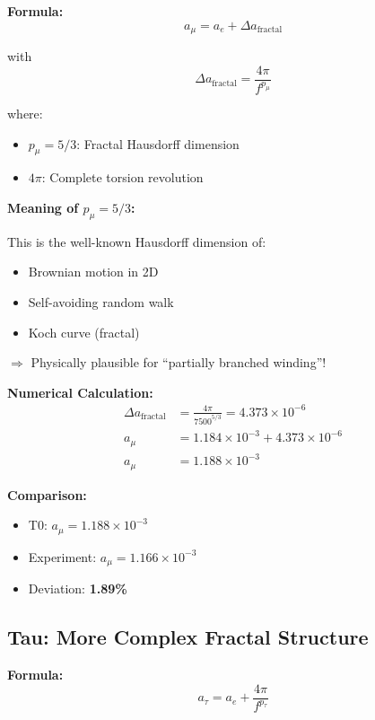 	\textbf{Formula:}
	\begin{equation}
		a_\mu = a_e + \Delta a_{\text{fractal}}
		\label{eq:amu}
	\end{equation}
	
	with
	\begin{equation}
		\Delta a_{\text{fractal}} = \frac{4\pi}{f^{p_\mu}}
		\label{eq:delta_mu}
	\end{equation}
	
	where:
	\begin{itemize}
		\item $p_\mu = 5/3$: Fractal Hausdorff dimension
		\item $4\pi$: Complete torsion revolution
	\end{itemize}
	
	\textbf{Meaning of $p_\mu = 5/3$:}
	
	This is the well-known Hausdorff dimension of:
	\begin{itemize}
		\item Brownian motion in 2D
		\item Self-avoiding random walk
		\item Koch curve (fractal)
	\end{itemize}
	
	$\Rightarrow$ Physically plausible for ``partially branched winding''!
	
	\textbf{Numerical Calculation:}
	\begin{align}
		\Delta a_{\text{fractal}} &= \frac{4\pi}{7500^{5/3}} = 4.373 \times 10^{-6} \\
		a_\mu &= 1.184 \times 10^{-3} + 4.373 \times 10^{-6} \\
		a_\mu &= 1.188 \times 10^{-3}
	\end{align}
	
	\textbf{Comparison:}
	\begin{itemize}
		\item T0: $a_\mu = 1.188 \times 10^{-3}$
		\item Experiment: $a_\mu = 1.166 \times 10^{-3}$
		\item Deviation: \textbf{1.89\%}
	\end{itemize}
	
	\subsection{Tau: More Complex Fractal Structure}
	
	\textbf{Formula:}
	\begin{equation}
		a_\tau = a_e + \frac{4\pi}{f^{p_\tau}}
		\label{eq:atau}
	\end{equation}
	
